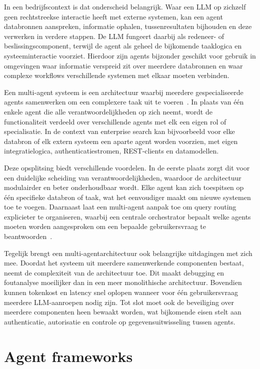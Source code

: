 In een bedrijfscontext is dat onderscheid belangrijk. Waar een \gls{LLM} op zichzelf geen rechtstreekse interactie heeft met externe systemen, kan een agent databronnen aanspreken, informatie ophalen, tussenresultaten bijhouden en deze verwerken in verdere stappen. De \gls{LLM} fungeert daarbij als redeneer- of beslissingscomponent, terwijl de agent als geheel de bijkomende taaklogica en systeeminteractie voorziet. Hierdoor zijn agents bijzonder geschikt voor gebruik in omgevingen waar informatie verspreid zit over meerdere databronnen en waar complexe workflows verschillende systemen met elkaar moeten verbinden.

Een multi-agent systeem is een architectuur waarbij meerdere gespecialiseerde agents samenwerken om een complexere taak uit te voeren~\cite{qiu2024collaborative,openai2025agents}. In plaats van één enkele agent die alle verantwoordelijkheden op zich neemt, wordt de functionaliteit verdeeld over verschillende agents met elk een eigen rol of specialisatie. In de context van enterprise search kan bijvoorbeeld voor elke databron of elk extern systeem een aparte agent worden voorzien, met eigen integratielogica, authenticatiestromen, \gls{REST}-clients en datamodellen.

Deze opsplitsing biedt verschillende voordelen. In de eerste plaats zorgt dit voor een duidelijke scheiding van verantwoordelijkheden, waardoor de architectuur modulairder en beter onderhoudbaar wordt. Elke agent kan zich toespitsen op één specifieke databron of taak, wat het eenvoudiger maakt om nieuwe systemen toe te voegen. Daarnaast laat een multi-agent aanpak toe om query routing explicieter te organiseren, waarbij een centrale orchestrator bepaalt welke agents moeten worden aangesproken om een bepaalde gebruikersvraag te beantwoorden~\cite{microsoft2024agentpatterns}.

Tegelijk brengt een multi-agentarchitectuur ook belangrijke uitdagingen met zich mee. Doordat het systeem uit meerdere samenwerkende componenten bestaat, neemt de complexiteit van de architectuur toe. Dit maakt debugging en foutanalyse moeilijker dan in een meer monolithische architectuur. Bovendien kunnen tokenkost en latency snel oplopen wanneer voor één gebruikersvraag meerdere \gls{LLM}-aanroepen nodig zijn. Tot slot moet ook de beveiliging over meerdere componenten heen bewaakt worden, wat bijkomende eisen stelt aan authenticatie, autorisatie en controle op gegevensuitwisseling tussen agents.

\section{Agent frameworks}
\label{sec:frameworks}


